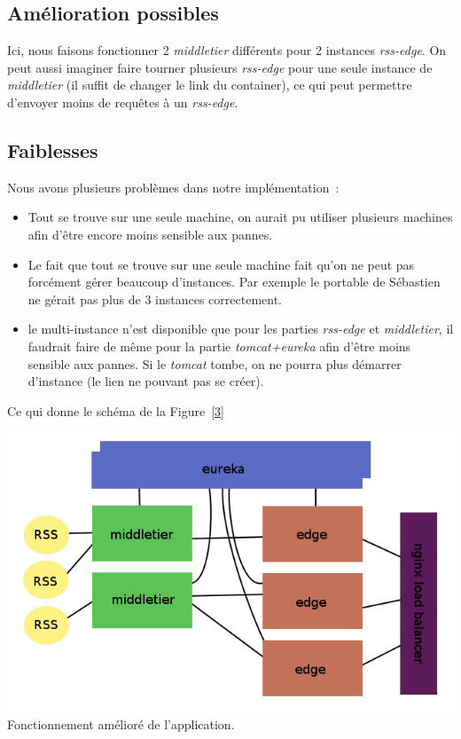 \documentclass{article}
\begin{document}
	\subsection{Amélioration possibles}
	Ici, nous faisons fonctionner 2 \emph{middletier} différents pour 2 instances \emph{rss-edge}. On peut aussi imaginer faire tourner plusieurs \emph{rss-edge} pour une seule instance de \emph{middletier} (il suffit de changer le link du container), ce qui peut permettre d'envoyer moins de requêtes à un \emph{rss-edge}.
	\subsection{Faiblesses}
	Nous avons plusieurs problèmes dans notre implémentation~:
	\begin{itemize}
		\item Tout se trouve sur une seule machine, on aurait pu utiliser plusieurs machines afin d'être encore moins sensible aux pannes.
		\item Le fait que tout se trouve sur une seule machine fait qu'on ne peut pas forcément gérer beaucoup d'instances. Par exemple le portable de Sébastien ne gérait pas plus de 3 instances correctement.
		\item le multi-instance n'est disponible que pour les parties \emph{rss-edge} et \emph{middletier}, il faudrait faire de même pour la partie \emph{tomcat+eureka} afin d'être moins sensible aux pannes. Si le \emph{tomcat} tombe, on ne pourra plus démarrer d'instance (le lien ne pouvant pas se créer).
	\end{itemize}

	Ce qui donne le schéma de la Figure~\ref{3}
	\begin{center}
		\includegraphics[scale=0.5]{future}\\
		Fonctionnement amélioré de l'application.
		\label{3}
	\end{center}
\end{document}
